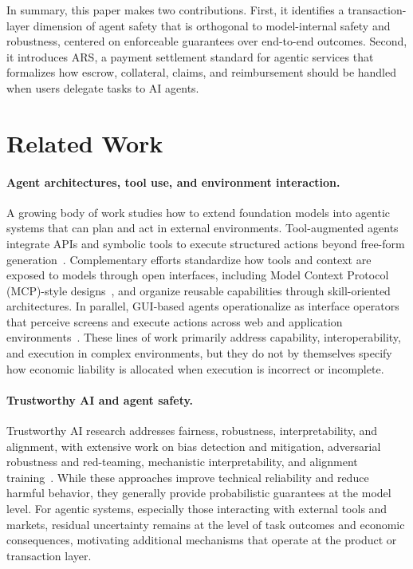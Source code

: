 \documentclass{article} %
\begin{document}
In summary, this paper makes two contributions. First, it identifies a transaction-layer dimension of agent safety that is orthogonal to model-internal safety and robustness, centered on enforceable guarantees over end-to-end outcomes. Second, it introduces \textsc{ARS}, a payment settlement standard for agentic services that formalizes how escrow, collateral, claims, and reimbursement should be handled when users delegate tasks to AI agents.







\section{Related Work}

\paragraph{Agent architectures, tool use, and environment interaction.}
A growing body of work studies how to extend foundation models into agentic systems that can plan and act in external environments. Tool-augmented agents integrate APIs and symbolic tools to execute structured actions beyond free-form generation~\citep{qin2023toolllm}. Complementary efforts standardize how tools and context are exposed to models through open interfaces, including Model Context Protocol (MCP)-style designs~\citep{guo2025mcp}, and organize reusable capabilities through skill-oriented architectures. In parallel, GUI-based agents operationalize as interface operators that perceive screens and execute actions across web and application environments~\citep{deng2023mind2web, nong2024mobileflow, zhang2024large, zhang2025appagent, sager2025comprehensive}. These lines of work primarily address capability, interoperability, and execution in complex environments, but they do not by themselves specify how economic liability is allocated when execution is incorrect or incomplete.

\paragraph{Trustworthy AI and agent safety.}
Trustworthy AI research addresses fairness, robustness, interpretability, and alignment, with extensive work on bias detection and mitigation, adversarial robustness and red-teaming, mechanistic interpretability, and alignment training~\citep{borah2024towards, chen2024agentpoison, bereska2024mechanistic, ji2023beavertails}. While these approaches improve technical reliability and reduce harmful behavior, they generally provide probabilistic guarantees at the model level. For agentic systems, especially those interacting with external tools and markets, residual uncertainty remains at the level of task outcomes and economic consequences, motivating additional mechanisms that operate at the product or transaction layer.
\end{document}
